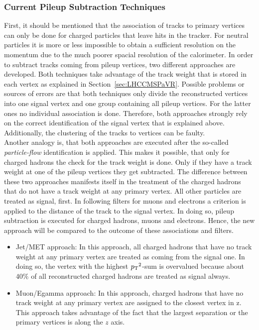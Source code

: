 \subsubsection{Current Pileup Subtraction Techniques \label{sec:IntroCurPST}}

First, it should be mentioned that the association of tracks to primary vertices can only be done for charged particles that leave hits in the tracker. For neutral particles it is more or less impossible to obtain a sufficient resolution on the momentum due to the much poorer spacial resolution of the calorimeter. In order to subtract tracks coming from pileup vertices, two different approaches are developed. Both techniques take advantage of the track weight that is stored in each vertex as explained in Section~\ref{sec:LHCCMSPaVR}. Possible problems or sources of errors are that both techniques only divide the reconstructed vertices into one signal vertex and one group containing all pileup vertices. For the latter ones no individual association is done. Therefore, both approaches strongly rely on the correct identification of the signal vertex that is explained above. Additionally, the clustering of the tracks to vertices can be faulty. \\
Another analogy is, that both approaches are executed after the so-called \textit{particle-flow} identification is applied. This makes it possible, that only for charged hadrons  the check for the track weight is done.  Only if they have a track weight at one of the pileup vertices they get subtracted. The difference between these two approaches manifests itself in the treatment of the charged hadrons that do not have a track weight at any primary vertex. All other particles are treated as signal, first. In following filters for muons and electrons a criterion is applied to the distance of the track to the signal vertex. In doing so, pileup subtraction is executed for charged hadrons, muons and electrons. Hence, the new approach will be compared to the outcome of these associations and filters.

\begin{itemize}
    \item{Jet/MET approach:} In this approach, all charged hadrons that have no track weight at any primary vertex are treated as coming from the signal one. In doing so, the vertex with the highest $p_{\mathrm{T}}{}^{2}$-sum is overvalued because about $40\%$ of all reconstructed charged hadrons are treated as signal always.

\item{Muon/Egamma approach:} In this approach, charged hadrons that have no track weight at any primary vertex are assigned to the closest vertex in z. This approach takes advantage of the fact that the largest separation or the primary vertices is along the $z$ axis.
\end{itemize}

